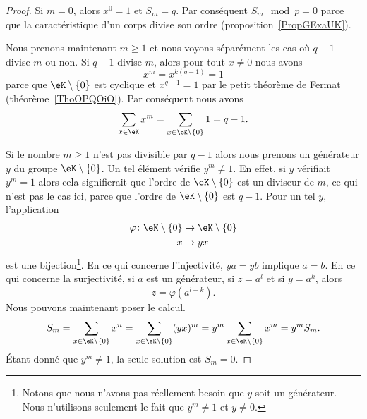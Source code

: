 \begin{proof}
	Si \( m=0\), alors \( x^0=1\) et \( S_m=q\). Par conséquent \( S_m\mod p=0\) parce que la caractéristique d'un corps divise son ordre (proposition~\ref{PropGExaUK}).

	Nous prenons maintenant \( m\geq 1\) et nous voyons séparément les cas où \( q-1\) divise \( m\) ou non. Si \( q-1\) divise \( m\), alors pour tout \( x\neq 0\) nous avons
	\begin{equation}
		x^m=x^{k(q-1)}=1
	\end{equation}
	parce que \( \eK\setminus\{ 0 \}\) est cyclique et \( x^{q-1}=1\) par le petit théorème de Fermat (théorème~\ref{ThoOPQOiO}). Par conséquent nous avons
	\begin{equation}
		\sum_{x\in \eK}x^m=\sum_{x\in \eK\setminus\{ 0 \}}1=q-1.
	\end{equation}

	Si le nombre \( m\geq 1\) n'est pas divisible par \( q-1\) alors nous prenons un générateur \( y\) du groupe \( \eK\setminus\{ 0 \}\). Un tel élément vérifie \( y^m\neq 1\). En effet, si \( y\) vérifiait \( y^m=1\) alors cela signifierait que l'ordre de \( \eK\setminus\{ 0 \}\) est un diviseur de \( m\), ce qui n'est pas le cas ici, parce que l'ordre de \( \eK\setminus\{ 0 \}\) est \( q-1\). Pour un tel \( y\), l'application
	\begin{equation}
		\begin{aligned}
			\varphi\colon \eK\setminus\{ 0 \} & \to \eK\setminus\{ 0 \} \\
			x                                 & \mapsto yx
		\end{aligned}
	\end{equation}
	est une bijection\footnote{Notons que nous n'avons pas réellement besoin que \( y\) soit un générateur. Nous n'utilisons seulement le fait que \( y^m\neq 1\) et \( y\neq 0\).}. En ce qui concerne l'injectivité, \( ya=yb\) implique \( a=b\). En ce qui concerne la surjectivité, si \( a\) est un générateur, si \( z=a^l\) et si \( y=a^k\), alors
	\begin{equation}
		z=\varphi(a^{l-k}).
	\end{equation}
	Nous pouvons maintenant poser le calcul.
	\begin{equation}
		S_m=\sum_{x\in \eK\setminus\{ 0 \}}x^n=\sum_{x\in \eK\setminus\{ 0 \}}(yx)^m=y^m\sum_{x\in \eK\setminus\{ 0 \}}x^m=y^mS_m.
	\end{equation}
	Étant donné que \( y^m\neq 1\), la seule solution est \( S_m=0\).
\end{proof}

